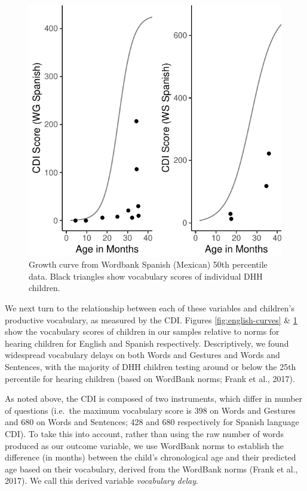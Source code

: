 \documentclass[
  english,
  man]{apa6}
\begin{document}
\begin{figure}
\centering
\includegraphics{ELSSP_paper_files/figure-latex/spanish-curves-1.pdf}
\caption{\label{fig:spanish-curves}Growth curve from Wordbank Spanish (Mexican) 50th percentile data. Black triangles show vocabulary scores of individual DHH children.}
\end{figure}

We next turn to the relationship between each of these variables and children's productive vocabulary, as measured by the CDI. Figures \ref{fig:english-curves} \& \ref{fig:spanish-curves} show the vocabulary scores of children in our samples relative to norms for hearing children for English and Spanish respectively. Descriptively, we found widespread vocabulary delays on both Words and Gestures and Words and Sentences, with the majority of DHH children testing around or below the 25th percentile for hearing children (based on WordBank norms; Frank et al., 2017).

As noted above, the CDI is composed of two instruments, which differ in number of questions (i.e.~the maximum vocabulary score is 398 on Words and Gestures and 680 on Words and Sentences; 428 and 680 respectively for Spanish language CDI). To take this into account, rather than using the raw number of words produced as our outcome variable, we use WordBank norms to establish the difference (in months) between the child's chronological age and their predicted age based on their vocabulary, derived from the WordBank norms (Frank et al., 2017). We call this derived variable \emph{vocabulary delay}.
\end{document}
